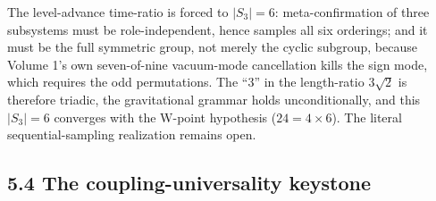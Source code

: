 \documentclass[11pt,oneside]{report}
\theoremstyle{definition}
\theoremstyle{remark}
\begin{document}
The level-advance time-ratio is forced to \ensuremath{|S_3| = 6}:
meta-confirmation of three subsystems must be role-independent, hence
samples all six orderings; and it must be the full symmetric group, not
merely the cyclic subgroup, because Volume 1's own seven-of-nine
vacuum-mode cancellation kills the sign mode, which requires the odd
permutations. The ``3'' in the length-ratio \ensuremath{3\sqrt{2}} is
therefore triadic, the gravitational grammar holds unconditionally, and
this \ensuremath{|S_3| = 6} converges with the W-point hypothesis
(\ensuremath{24 = 4 \times 6}). The literal sequential-sampling
realization remains open.

\subsection*{5.4 The coupling-universality keystone}
\end{document}
